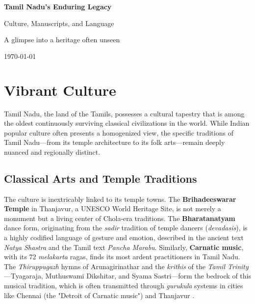 \documentclass[12pt]{article}
\begin{document}
\begin{titlepage}
    \centering
    \vspace*{2cm}
    {\Huge\bfseries\color{headcolor} Tamil Nadu's Enduring Legacy\par}
    \vspace{1cm}
    {\Large Culture, Manuscripts, and Language\par}
    \vspace{2cm}
    {\large A glimpse into a heritage often unseen\par}
    \vspace{3cm}
    \vfill
    {\today\par}
\end{titlepage}

\tableofcontents
\newpage

\section{Vibrant Culture}
Tamil Nadu, the land of the Tamils, possesses a cultural tapestry that is among the oldest continuously surviving classical civilizations in the world. While Indian popular culture often presents a homogenized view, the specific traditions of Tamil Nadu—from its temple architecture to its folk arts—remain deeply nuanced and regionally distinct.

\subsection{Classical Arts and Temple Traditions}
The culture is inextricably linked to its temple towns. The \textbf{Brihadeeswarar Temple} in Thanjavur, a UNESCO World Heritage Site, is not merely a monument but a living center of Chola-era traditions. The \textbf{Bharatanatyam} dance form, originating from the \textit{sadir} tradition of temple dancers (\textit{devadasis}), is a highly codified language of gesture and emotion, described in the ancient text \textit{ Natya Shastra} and the Tamil text \textit{Pancha Marabu}. Similarly, \textbf{Carnatic music}, with its 72 \textit{melakarta} ragas, finds its most ardent practitioners in Tamil Nadu. The \textit{Thiruppugazh} hymns of Arunagirinathar and the \textit{krithis} of the \textit{Tamil Trinity}—Tyagaraja, Muthuswami Dikshitar, and Syama Sastri—form the bedrock of this musical tradition, which is often transmitted through \textit{gurukula} systems in cities like Chennai (the "Detroit of Carnatic music") and Thanjavur \cite{krishnaswamy2001}.
\end{document}
